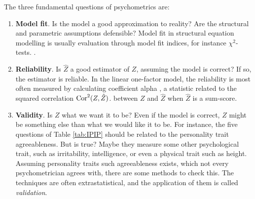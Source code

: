 The three fundamental questions of psychometrics are:
\begin{enumerate}
\item \textbf{Model fit}. Is the model a good approximation to reality? Are the structural and parametric assumptions defensible? Model fit in structural equation modelling is usually evaluation through model fit indices, for instance $\chi^{2}$-tests. \parencite[Chapter 15]{Mulaik2009-gc}.
\item \textbf{Reliability}. Is $\hat{Z}$ a good estimator of $Z$, assuming the model is correct? If so, the estimator is reliable. In the linear one-factor model, the reliability is most often measured by calculating coefficient alpha \parencite{Cronbach1951-in}, a statistic related to the squared correlation $\operatorname{Cor}^{2}(Z,\hat{Z})$. between $Z$ and $\hat{Z}$ when $\hat{Z}$ is a sum-score.
\item \textbf{Validity}. Is $Z$ what we want it to be? Even if the model is correct, $Z$ might be something else than what we would like it to be. For instance, the five questions of Table \ref{tab:IPIP} should be related to the personality trait agreeableness. But is true? Maybe they measure some other psychological trait, such as irritability, intelligence, or even a physical trait such as height. Assuming personality traits such agreeableness exists, which not every psychometrician agrees with, there are some methods to check this. The techniques are often extrastatistical, and the application of them is called \emph{validation}. \parencite[Chapter 6]{Borsboom2005-iq}
\end{enumerate}